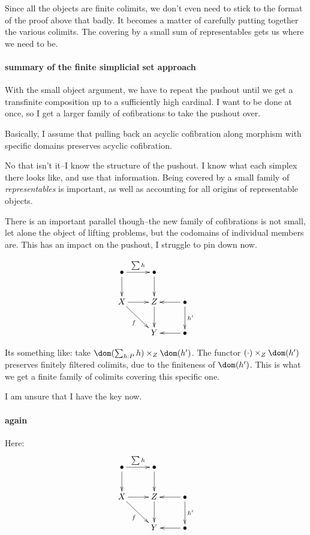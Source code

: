 \documentclass[csh.tex]{subfiles}
\begin{document}
Since all the objects are finite colimits, we don't even need to stick to the format of the proof above that badly. It becomes a matter of carefully putting together the various colimits. The covering by a small sum of representables gets us where we need to be.

\paragraph{summary of the finite simplicial set approach}
With the small object argument, we have to repeat the pushout until we get a transfinite composition up to a sufficiently high cardinal. I want to be done at once, so I get a larger family of cofibrations to take the pushout over.

Basically, I assume that pulling back an acyclic cofibration along morphism with specific domains preserves acyclic cofibration.

No that isn't it--I know the structure of the pushout. I know what each simplex there looks like, and use that information. Being covered by a small family of \emph{representables} is important, as well as accounting for all origins of representable objects.

There is an important parallel though--the new family of cofibrations is not small, let alone the object of lifting problems, but the codomains of individual members are. This has an impact on the pushout, I struggle to pin down now. 

\[\xymatrix{
\bullet \ar[d]\ar[r]^{\sum h} & \bullet\ar[d]\\
X\ar[dr]_f\ar[r]& Z \ar[d] & \bullet \ar[l]\ar[d]^{h'}\\
& Y& \bullet \ar[l]
}\]

Its something like: take $\dom(\sum_{h\of P} h)\times_Z\dom(h')$. The functor $(\cdot)\times_Z\dom(h')$ preserves finitely filtered colimits, due to the finiteness of $\dom(h')$. This is what we get a finite family of colimits covering this specific one.

I am unsure that I have the key now. 

\paragraph{again}
Here:
\[\xymatrix{
\bullet \ar[d]\ar[r]^{\sum h} & \bullet\ar[d]\\
X\ar[dr]_f\ar[r]& Z \ar[d] & \bullet \ar[l]\ar[d]^{h'}\\
& Y& \bullet \ar[l]
}\]
\end{document}
